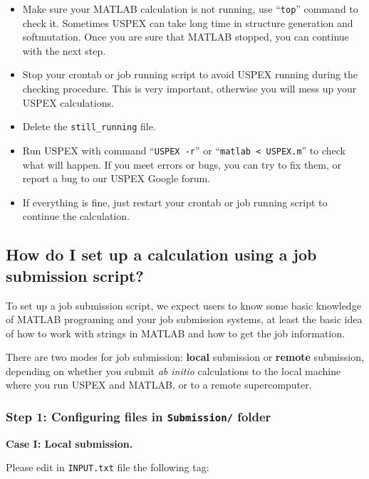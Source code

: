 \documentclass[12pt]{article}
\newcommand{\file}[1]{\texttt{#1}}
\begin{document}
\begin{itemize}

\item Make sure your MATLAB calculation is not running, use ``\texttt{top}''
command to check it. Sometimes USPEX can take long time in structure generation
and softmutation. Once you are sure that MATLAB stopped, you can continue with
the next step.

\item Stop your crontab or job running script to avoid USPEX running during the
checking procedure. This is very important, otherwise you will mess up your
USPEX calculations.

\item Delete the \file{still\_running} file.

\item Run USPEX with command ``\texttt{USPEX -r}'' or ``\texttt{matlab <
USPEX.m}'' to check what will happen. If you meet errors or bugs, you can try to
fix them, or report a bug to our USPEX Google forum.

\item If everything is fine, just restart your crontab or job running script to
continue the calculation.

\end{itemize}

\subsection{How do I set up a calculation using a job submission script?}
\label{faq_job_submit}

To set up a job submission script, we expect users to know some basic knowledge
of MATLAB programing and your job submission systems, at least the basic idea of
how to work with strings in MATLAB and how to get the job information.

There are two modes for job submission: \textbf{local} submission or
\textbf{remote} submission, depending on whether you submit \emph{ab initio}
calculations to the local machine where you run USPEX and MATLAB, or to a remote
supercomputer.

\subsubsection{Step 1: Configuring files in \file{Submission/} folder}

\textbf{Case I: Local submission. }

Please edit in \file{INPUT.txt} file the following tag:
\end{document}
